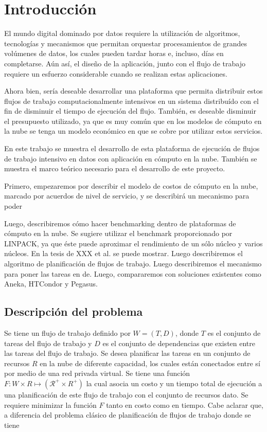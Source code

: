 \chapter{Introducción}

El mundo digital dominado por datos requiere la utilización de algoritmos, tecnologías y mecanismos que permitan orquestar procesamientos de grandes volúmenes de datos, los cuales pueden tardar horas e, incluso, días en completarse. Aún así, el diseño de la aplicación, junto con el flujo de trabajo requiere un esfuerzo considerable cuando se realizan estas aplicaciones.

Ahora bien, sería deseable desarrollar una plataforma que permita distribuir estos flujos de trabajo computacionalmente intensivos en un sistema distribuído con el fin de disminuir el tiempo de ejecución del flujo. También, es deseable disminuir el presupuesto utilizado, ya que es muy común que en los modelos de cómputo en la nube se tenga un modelo económico en que se cobre por utilizar estos servicios.

En este trabajo se muestra el desarrollo de esta plataforma de ejecución de flujos de trabajo intensivo en datos con aplicación en cómputo en la nube. También se muestra el marco teórico necesario para el desarrollo de este proyecto.

Primero, empezaremos por describir el modelo de costos de cómputo en la nube, marcado por acuerdos de nivel de servicio, y se describirá un mecanismo para poder

Luego, describiremos cómo hacer benchmarking dentro de plataformas de cómputo en la nube. Se sugiere utilizar el benchmark proporcionado por LINPACK, ya que éste puede aproximar el rendimiento de un sólo núcleo y varios núcleos. En la tesis de XXX et al. se puede mostrar. Luego describiremos el algoritmo de planificación de flujos de trabajo. Luego describiremos el mecanismo para poner las tareas en de. Luego, compararemos con soluciones existentes como Aneka, HTCondor y Pegasus.


\section{Descripción del problema}

Se tiene un flujo de trabajo definido por $W = (T, D)$, donde $T$ es el conjunto de tareas del flujo de trabajo y $D$ es el conjunto de dependencias que existen entre las tareas del flujo de trabajo. Se desea planificar las tareas en un conjunto de recursos $R$ en la nube de diferente capacidad, los cuales están conectados entre sí por medio de una red privada virtual. Se tiene una función $F: W \times R \mapsto (\mathcal{R}^{+} \times {R}^{+}) $ la cual asocia un costo y un tiempo total de ejecución a una planificación de este flujo de trabajo con el conjunto de recursos dato. Se requiere minimizar la función $F$ tanto en costo como en tiempo. Cabe aclarar que, a diferencia del problema clásico de planificación de flujos de trabajo donde se tiene


